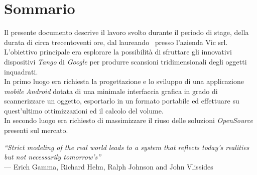 
\cleardoublepage
{}
{}
\begingroup
\let\clearpage\relax
\let\cleardoublepage\relax
\let\cleardoublepage\relax

\chapter*{Sommario}

Il presente documento descrive il lavoro svolto durante il periodo di stage, della durata di circa trecentoventi ore, dal laureando \myName \ presso l'azienda Vic srl.\\
L'obiettivo principale era esplorare la possibilità di sfruttare gli innovativi dispositivi \emph{Tango} di \emph{Google} per produrre scansioni tridimensionali degli oggetti inquadrati.\\
In primo luogo era richiesta la progettazione e lo sviluppo di una applicazione \emph{mobile} \emph{Android} dotata di una minimale interfaccia grafica in grado di scannerizzare un oggetto, esportarlo in un formato portabile ed effettuare su quest'ultimo ottimizzazioni ed il calcolo del volume.\\
In secondo luogo era richiesto di massimizzare il riuso delle soluzioni \emph{OpenSource} presenti sul mercato. 
%
%

\endgroup			

\vfill


\begin{flushright}{
	\slshape  
	``Strict modeling of the real world leads to a system that reflects today's realities but not necessarily tomorrow's''} \\ 
	\medskip
    --- Erich Gamma, Richard Helm, Ralph Johnson and John Vlissides
\end{flushright}

